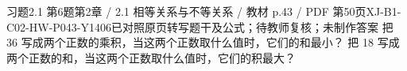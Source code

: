 \par\noindent\begin{minipage}{\linewidth}
\begin{bankitem}{习题2.1 第6题}{第2章 / 2.1 相等关系与不等关系 / 教材 p.43 / PDF 第50页}{XJ-B1-C02-HW-P043-Y1406}{已对照原页转写题干及公式；待教师复核；未制作答案}
把 36 写成两个正数的乘积，当这两个正数取什么值时，它们的和最小？
把 18 写成两个正数的和，当这两个正数取什么值时，它们的积最大？
\end{bankitem}
\end{minipage}\par\medskip
